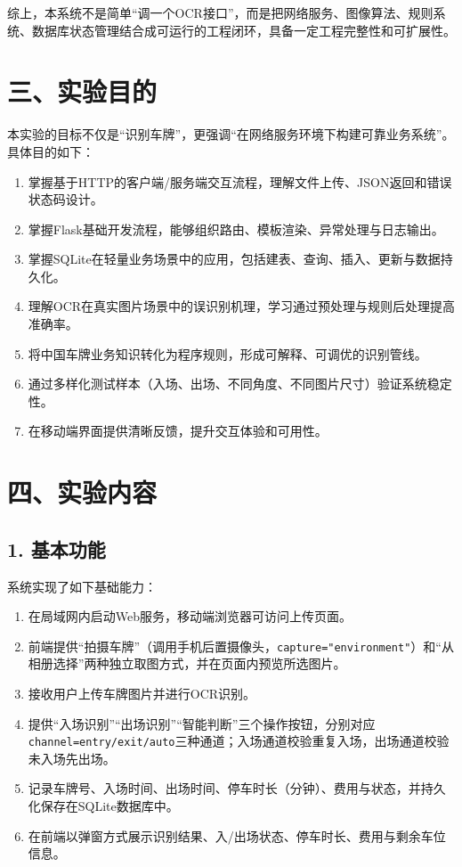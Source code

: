 \documentclass[12pt,a4paper]{article}
\begin{document}
综上，本系统不是简单“调一个OCR接口”，而是把网络服务、图像算法、规则系统、数据库状态管理结合成可运行的工程闭环，具备一定工程完整性和可扩展性。

\section*{三、实验目的}
本实验的目标不仅是“识别车牌”，更强调“在网络服务环境下构建可靠业务系统”。具体目的如下：

\begin{enumerate}
  \item 掌握基于HTTP的客户端/服务端交互流程，理解文件上传、JSON返回和错误状态码设计。
  \item 掌握Flask基础开发流程，能够组织路由、模板渲染、异常处理与日志输出。
  \item 掌握SQLite在轻量业务场景中的应用，包括建表、查询、插入、更新与数据持久化。
  \item 理解OCR在真实图片场景中的误识别机理，学习通过预处理与规则后处理提高准确率。
  \item 将中国车牌业务知识转化为程序规则，形成可解释、可调优的识别管线。
  \item 通过多样化测试样本（入场、出场、不同角度、不同图片尺寸）验证系统稳定性。
  \item 在移动端界面提供清晰反馈，提升交互体验和可用性。
\end{enumerate}

\section*{四、实验内容}
\subsection*{1. 基本功能}
系统实现了如下基础能力：
\begin{enumerate}
  \item 在局域网内启动Web服务，移动端浏览器可访问上传页面。
  \item 前端提供“拍摄车牌”（调用手机后置摄像头，\texttt{capture="environment"}）和“从相册选择”两种独立取图方式，并在页面内预览所选图片。
  \item 接收用户上传车牌图片并进行OCR识别。
  \item 提供“入场识别”“出场识别”“智能判断”三个操作按钮，分别对应\texttt{channel=entry/exit/auto}三种通道；入场通道校验重复入场，出场通道校验未入场先出场。
  \item 记录车牌号、入场时间、出场时间、停车时长（分钟）、费用与状态，并持久化保存在SQLite数据库中。
  \item 在前端以弹窗方式展示识别结果、入/出场状态、停车时长、费用与剩余车位信息。
\end{enumerate}
\end{document}
